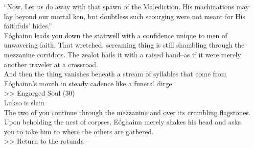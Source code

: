 “Now. Let us do away with that spawn of the Malediction. His machinations may lay beyond our mortal ken, but doubtless such scourging were not meant for His faithfuls’ hides.”\\

Eóghainn leads you down the stairwell with a confidence unique to men of unwavering faith. That wretched, screaming thing is still shambling through the mezzanine corridors. The zealot hails it with a raised hand--as if it were merely another traveler at a crossroad.\\

And then the thing vanishes beneath a stream of syllables that come from Eóghainn’s mouth in steady cadence like a funeral dirge.\\
>> Engorged Soul (30)\\
 Lukso is slain\\

The two of you continue through the mezzanine and over its crumbling flagstones. Upon beholding the nest of corpses, Eóghainn merely shakes his head and asks you to take him to where the others are gathered.\\

>> Return to the rotunda -- 